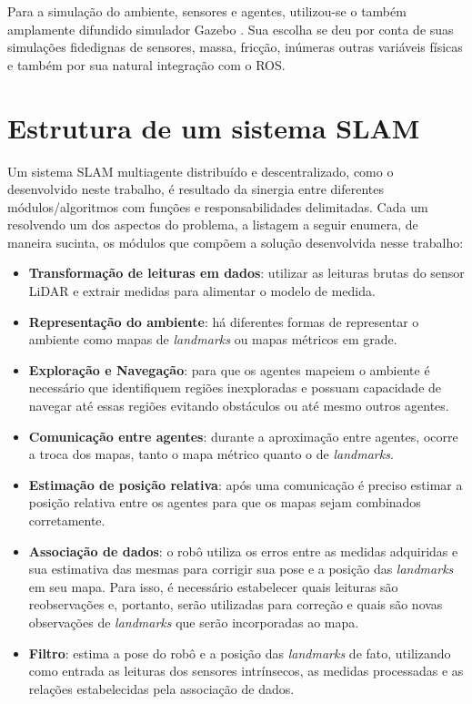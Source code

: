 Para a simulação do ambiente, sensores e agentes, utilizou-se o também 
amplamente difundido simulador Gazebo \cite{Koenig-2004-394}. Sua escolha 
se deu por conta de suas simulações fidedignas de sensores, massa, fricção, inúmeras outras variáveis físicas e também por sua natural integração com o ROS.


\section{Estrutura de um sistema SLAM}
Um sistema SLAM multiagente distribuído e descentralizado, como o 
desenvolvido neste trabalho, é resultado da sinergia entre diferentes 
módulos/algoritmos com funções e responsabilidades delimitadas. Cada um 
resolvendo um dos aspectos do problema, a listagem a seguir enumera, de 
maneira sucinta, os módulos que compõem a solução desenvolvida nesse trabalho: 
\begin{itemize}
  \item \textbf{Transformação de leituras em dados}: utilizar as leituras 
  brutas do sensor LiDAR e extrair medidas para alimentar o modelo de medida.
  \item \textbf{Representação do ambiente}: há diferentes formas de 
  representar o ambiente como mapas de \textit{landmarks} ou mapas 
  métricos em grade.
  \item \textbf{Exploração e Navegação}: para que os agentes mapeiem o 
  ambiente é necessário que identifiquem regiões inexploradas e possuam 
  capacidade de navegar até essas regiões evitando obstáculos ou até 
  mesmo outros agentes.
  \item \textbf{Comunicação entre agentes}: durante a aproximação entre 
  agentes, ocorre a troca dos mapas, tanto o mapa métrico quanto o de 
  \textit{landmarks}.
  \item \textbf{Estimação de posição relativa}: após uma comunicação é 
  preciso estimar a posição relativa entre os agentes para que os mapas 
  sejam combinados corretamente.
  \item \textbf{Associação de dados}: o robô utiliza os erros entre as 
  medidas adquiridas e sua estimativa das mesmas para 
  corrigir sua pose e a posição das \textit{landmarks} em seu mapa. 
  Para isso, é necessário estabelecer quais leituras são 
  reobservações e, portanto, serão utilizadas para correção e quais são 
  novas observações de \textit{landmarks} que serão incorporadas ao mapa.
  \item \textbf{Filtro}: estima a pose do robô e a posição das \textit{landmarks} de fato, utilizando como entrada as leituras dos 
  sensores intrínsecos, as medidas processadas e as relações 
  estabelecidas pela associação de dados.
\end{itemize}

